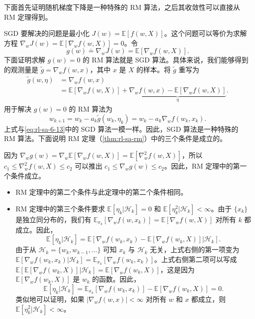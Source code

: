 \begin{insight}
下面首先证明随机梯度下降是一种特殊的 RM 算法，之后其收敛性可以直接从 RM 定理得到。

SGD 要解决的问题是最小化 $J(w) = \mathbb{E}[f(w, X)]$。这个问题可以等价为求解方程 $\nabla_w J(w) = \mathbb{E}[\nabla_w f(w, X)] = 0$。令
\begin{equation}
g(w) \doteq \nabla_w J(w) = \mathbb{E}[\nabla_w f(w, X)].
\end{equation}
下面证明求解 $g(w) = 0$ 的 RM 算法就是 SGD 算法。具体来说，我们能够得到的观测量是 $\tilde{g} = \nabla_w f(w, x)$，其中 $x$ 是 $X$ 的样本。将 $\tilde{g}$ 重写为
\begin{equation}
\begin{aligned}
\tilde{g}(w, \eta) &= \nabla_w f(w, x) \\
&= \mathbb{E}[\nabla_w f(w, X)] + \underbrace{\nabla_w f(w, x) - \mathbb{E}[\nabla_w f(w, X)]}_{\eta}.
\end{aligned}
\end{equation}
用于解决 $g(w) = 0$ 的 RM 算法为
\begin{equation}
w_{k+1} = w_k - a_k \tilde{g}(w_k, \eta_k) = w_k - a_k \nabla_w f(w_k, x_k).
\end{equation}
上式与\eqref{eq:rl-sa-6-13}中的 SGD 算法一模一样。因此，SGD 算法是一种特殊的 RM 算法。下面说明 RM 定理（\cref{thm:rl-sa-rm}）中的三个条件是成立的。

因为 $\nabla_w g(w) = \nabla_w \mathbb{E}[\nabla_w f(w, X)] = \mathbb{E}[\nabla_w^2 f(w, X)]$，所以 $c_1 \leqslant \nabla_w^2 f(w, X) \leqslant c_2$ 可以推出 $c_1 \leqslant \nabla_w g(w) \leqslant c_2$。因此，RM 定理中的第一个条件成立。

\begin{itemize}
  \item RM 定理中的第二个条件与此定理中的第二个条件相同。

  \item RM 定理中的第三个条件要求 $\mathbb{E}[\eta_k | \mathcal{H}_k] = 0$ 和 $\mathbb{E}[\eta_k^2 | \mathcal{H}_k] < \infty$。由于 $\{x_k\}$ 是独立同分布的，我们有 $\mathbb{E}_{x_k}[\nabla_w f(w, x_k)] = \mathbb{E}[\nabla_w f(w, X)]$ 对所有 $k$ 都成立。因此，
  \begin{equation}
  \mathbb{E}[\eta_k | \mathcal{H}_k] = \mathbb{E}[\nabla_w f(w_k, x_k) - \mathbb{E}[\nabla_w f(w_k, X)] | \mathcal{H}_k].
  \end{equation}
  由于从 $\mathcal{H}_k = \{w_k, w_{k-1}, \ldots\}$ 可知 $x_k$ 与 $\mathcal{H}_k$ 无关，上式右侧的第一项变为 $\mathbb{E}[\nabla_w f(w_k, x_k) | \mathcal{H}_k] = \mathbb{E}_{x_k}[\nabla_w f(w_k, x_k)]$。上式右侧第二项可以写成 $\mathbb{E}[\mathbb{E}[\nabla_w f(w_k, X)] | \mathcal{H}_k] = \mathbb{E}[\nabla_w f(w_k, X)]$，这是因为 $\mathbb{E}[\nabla_w f(w_k, X)]$ 是 $w_k$ 的函数。因此，
  \begin{equation}
  \mathbb{E}[\eta_k | \mathcal{H}_k] = \mathbb{E}_{x_k}[\nabla_w f(w_k, x_k)] - \mathbb{E}[\nabla_w f(w_k, X)] = 0.
  \end{equation}
  类似地可以证明，如果 $|\nabla_w f(w, x)| < \infty$ 对所有 $w$ 和 $x$ 都成立，则 $\mathbb{E}[\eta_k^2 | \mathcal{H}_k] < \infty$。
\end{itemize}


\end{insight}
